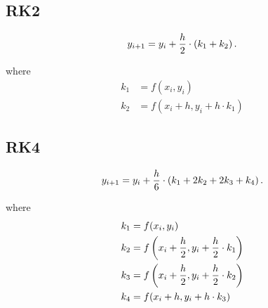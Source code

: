 \documentclass{report}
\begin{document}
\subsection{RK2}

\[
	y_{i+1} = y_i + \frac{h}{2}\cdot\left(k_1 + k_2\right)
	.\]

where
\begin{align*}
	k_1 & = f(x_i,y_i)                  \\
	k_2 & = f(x_i + h,y_i + h\cdot k_1)
\end{align*}

\subsection{RK4}

\[
	y_{i+1} = y_i + \frac{h}{6}\cdot\left(k_1 + 2k_2 + 2k_3 + k_4\right)
	.\]

where
\begin{align*}
	k_1 & = f(x_i,y_i)                                            \\
	k_2 & = f\left(x_i + \frac{h}{2},y_i + \frac{h}{2}\cdot k_1\right) \\
	k_3 & = f\left(x_i + \frac{h}{2},y_i + \frac{h}{2}\cdot k_2\right) \\
	k_4 & = f(x_i + h,y_i + h\cdot k_3)
\end{align*}
\end{document}
